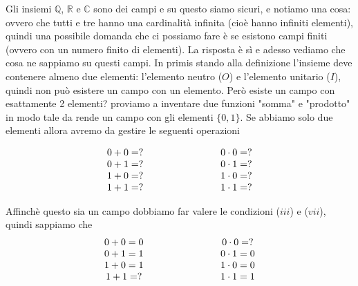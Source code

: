 \documentclass{rapport}
\begin{document}
Gli insiemi $\mathbb{Q}$, $\mathbb{R}$ e $\mathbb{C}$ sono dei campi e su questo siamo sicuri, e notiamo una cosa: ovvero che tutti e tre hanno una cardinalità infinita (cioè hanno infiniti elementi), quindi una possibile domanda che ci possiamo fare è se esistono campi finiti (ovvero con un numero finito di elementi). La risposta è sì e adesso vediamo che cosa ne sappiamo su questi campi. In primis stando alla definizione l'insieme deve contenere almeno due elementi: l'elemento neutro ($O$) e l'elemento unitario ($I$), quindi non può esistere un campo con un elemento. Però esiste un campo con esattamente 2 elementi? proviamo a inventare due funzioni "somma" e "prodotto" in modo tale da rende un campo con gli elementi $\{0,1\}$. Se abbiamo solo due elementi allora avremo da gestire le seguenti operazioni

\[
\begin{array}{c@{\qquad}@{\qquad}@{\qquad}@{\qquad}c}
  0 + 0 = ? &  0 \cdot 0 = ? \\
  0 + 1 = ? &  0 \cdot 1 = ? \\
  1 + 0 = ? &  1 \cdot 0 = ? \\
  1 + 1 = ? &  1 \cdot 1 = ? \\ 
\end{array}
\]

Affinchè questo sia un campo dobbiamo far valere le condizioni ($iii$) e ($vii$), quindi sappiamo che 
\[
\begin{array}{c@{\qquad}@{\qquad}@{\qquad}@{\qquad}c}
  0 + 0 = 0 &  0 \cdot 0 = ? \\
  0 + 1 = 1 &  0 \cdot 1 = 0 \\
  1 + 0 = 1 &  1 \cdot 0 = 0 \\
  1 + 1 = ? &  1 \cdot 1 = 1 \\ 
\end{array}
\]
\end{document}
